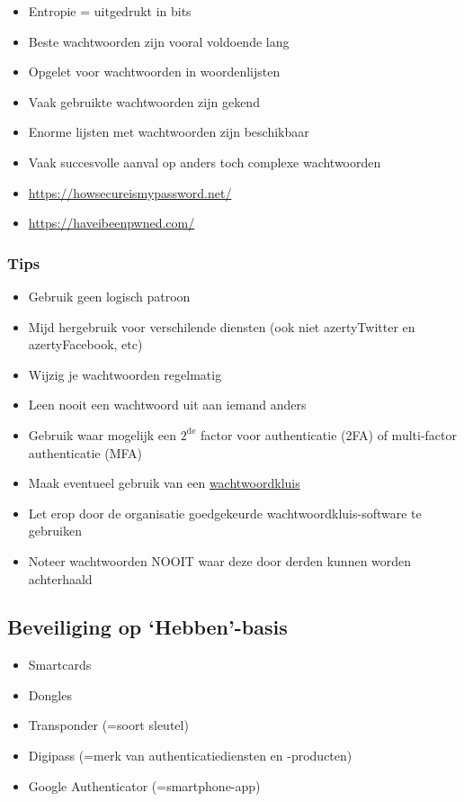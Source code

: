 \documentclass{article}
\begin{document}
\begin{itemize}
    \item Entropie = uitgedrukt in bits
    \item Beste wachtwoorden zijn vooral voldoende lang
    \item Opgelet voor wachtwoorden in woordenlijsten
    \item Vaak gebruikte wachtwoorden zijn gekend
    \item Enorme lijsten met wachtwoorden zijn beschikbaar
    \item Vaak succesvolle aanval op anders toch complexe wachtwoorden
    \item \url{https://howsecureismypassword.net/}
    \item \url{https://haveibeenpwned.com/}
\end{itemize}

\subsubsection{Tips}

\begin{itemize}
    \item Gebruik geen logisch patroon
    \item Mijd hergebruik voor verschilende diensten (ook niet azertyTwitter en azertyFacebook, etc)
    \item Wijzig je wachtwoorden regelmatig
    \item Leen nooit een wachtwoord uit aan iemand anders
    \item Gebruik waar mogelijk een $\text{2}^{\text{de}}$ factor voor authenticatie (2FA) of multi-factor authenticatie (MFA)
    \item Maak eventueel gebruik van een \underline{wachtwoordkluis}
    \item Let erop door de organisatie goedgekeurde wachtwoordkluis-software te gebruiken
    \item Noteer wachtwoorden NOOIT waar deze door derden kunnen worden achterhaald
\end{itemize}

\subsection{Beveiliging op `Hebben'-basis}

\begin{itemize}
    \item Smartcards
    \item Dongles
    \item Transponder (=soort sleutel)
    \item Digipass (=merk van authenticatiediensten en -producten)
    \item Google Authenticator (=smartphone-app)
\end{itemize}
\end{document}
